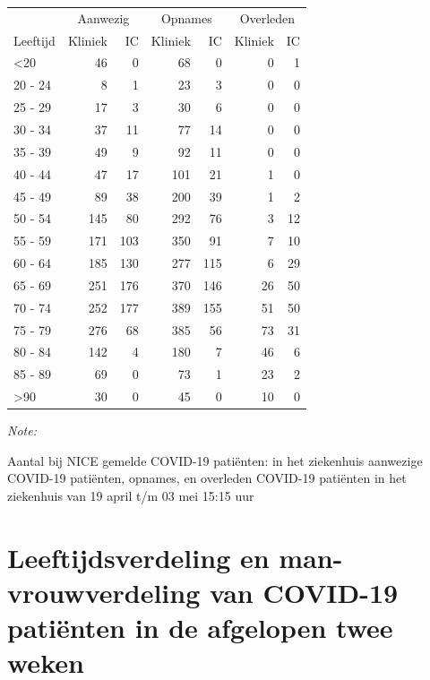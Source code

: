 \documentclass[
  english,
  man,floatsintext]{apa6}
\begin{document}
\begin{table}
\centering\begingroup\fontsize{10}{12}\selectfont

\begin{threeparttable}
\begin{tabular}{lrrrrrr}
\toprule
\multicolumn{1}{c}{ } & \multicolumn{2}{c}{Aanwezig} & \multicolumn{2}{c}{Opnames} & \multicolumn{2}{c}{Overleden} \\
\cmidrule(l{3pt}r{3pt}){2-3} \cmidrule(l{3pt}r{3pt}){4-5} \cmidrule(l{3pt}r{3pt}){6-7}
Leeftijd & Kliniek & IC & Kliniek & IC & Kliniek & IC\\
\midrule
<20 & 46 & 0 & 68 & 0 & 0 & 1\\
20 - 24 & 8 & 1 & 23 & 3 & 0 & 0\\
25 - 29 & 17 & 3 & 30 & 6 & 0 & 0\\
30 - 34 & 37 & 11 & 77 & 14 & 0 & 0\\
35 - 39 & 49 & 9 & 92 & 11 & 0 & 0\\
40 - 44 & 47 & 17 & 101 & 21 & 1 & 0\\
45 - 49 & 89 & 38 & 200 & 39 & 1 & 2\\
50 - 54 & 145 & 80 & 292 & 76 & 3 & 12\\
55 - 59 & 171 & 103 & 350 & 91 & 7 & 10\\
60 - 64 & 185 & 130 & 277 & 115 & 6 & 29\\
65 - 69 & 251 & 176 & 370 & 146 & 26 & 50\\
70 - 74 & 252 & 177 & 389 & 155 & 51 & 50\\
75 - 79 & 276 & 68 & 385 & 56 & 73 & 31\\
80 - 84 & 142 & 4 & 180 & 7 & 46 & 6\\
85 - 89 & 69 & 0 & 73 & 1 & 23 & 2\\
>90 & 30 & 0 & 45 & 0 & 10 & 0\\
\bottomrule
\end{tabular}
\begin{tablenotes}
\item \textit{Note: } 
\item Aantal bij NICE gemelde COVID-19 patiënten: in het ziekenhuis aanwezige COVID-19 patiënten, opnames, en overleden COVID-19 patiënten in het ziekenhuis van 19 april t/m 03 mei 15:15 uur
\end{tablenotes}
\end{threeparttable}
\endgroup{}
\end{table}

\newpage

\hypertarget{leeftijdsverdeling-en-man-vrouwverdeling-van-covid-19-patiuxebnten-in-de-afgelopen-twee-weken}{%
\section{Leeftijdsverdeling en man-vrouwverdeling van COVID-19 patiënten in de afgelopen twee weken}\label{leeftijdsverdeling-en-man-vrouwverdeling-van-covid-19-patiuxebnten-in-de-afgelopen-twee-weken}}
\end{document}
